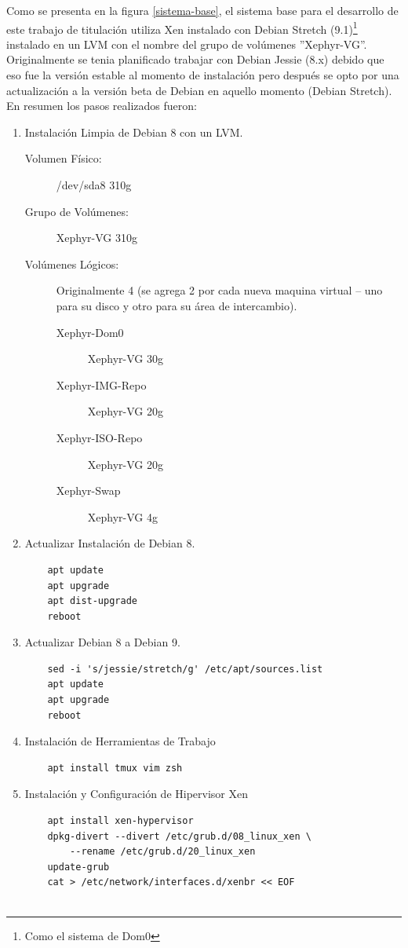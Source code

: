 Como se presenta en la figura \ref{sistema-base}, el sistema base para el desarrollo de este trabajo de titulación utiliza Xen instalado con Debian Stretch (9.1)\footnote{Como el sistema de Dom0} instalado en un LVM con el nombre del grupo de volúmenes ''Xephyr-VG''. Originalmente se tenia planificado trabajar con Debian Jessie (8.x) debido que eso fue la versión estable al momento de instalación pero después se opto por una actualización a la versión beta de Debian en aquello momento (Debian Stretch). En resumen los pasos realizados fueron:
\lstset{language=Bash}
\begin{enumerate}
	\item Instalación Limpia de Debian 8 con un LVM.
    	\begin{description}
    		\item[Volumen Físico:] /dev/sda8 310g 
            \item[Grupo de Volúmenes:] Xephyr-VG 310g
            \item[Volúmenes Lógicos:] Originalmente 4 (se agrega 2 por cada nueva maquina virtual -- uno para su disco y otro para su área de intercambio).
            \begin{description}
            	\item[Xephyr-Dom0] Xephyr-VG 30g
                \item[Xephyr-IMG-Repo] Xephyr-VG 20g
                \item[Xephyr-ISO-Repo] Xephyr-VG 20g
                \item[Xephyr-Swap] Xephyr-VG 4g
            \end{description}
    	\end{description}
    \item Actualizar Instalación de Debian 8.
    	\begin{lstlisting}
	apt update
	apt upgrade
	apt dist-upgrade
	reboot
        \end{lstlisting}
    \item Actualizar Debian 8 a Debian 9.
        \begin{lstlisting}
	sed -i 's/jessie/stretch/g' /etc/apt/sources.list
	apt update
	apt upgrade
	reboot
        \end{lstlisting}
    \item Instalación de Herramientas de Trabajo
        \begin{lstlisting}
	apt install tmux vim zsh
        \end{lstlisting}
    \item Instalación y Configuración de Hipervisor Xen
		\begin{lstlisting}
	apt install xen-hypervisor
	dpkg-divert --divert /etc/grub.d/08_linux_xen \
		--rename /etc/grub.d/20_linux_xen
	update-grub
	cat > /etc/network/interfaces.d/xenbr << EOF


\end{lstlisting}
\end{enumerate}
